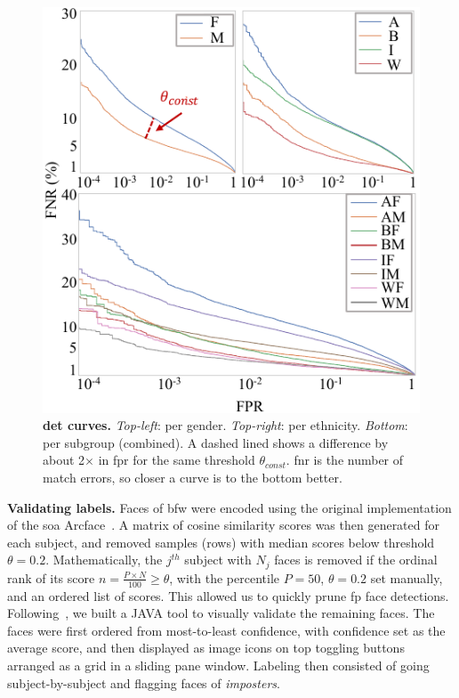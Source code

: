 \begin{figure}[!t] 
	\centering    
	\includegraphics[width=\linewidth]{figures/detcurve-improved.pdf}
		\caption{\textbf{\gls{det} curves.} \emph{Top-left}: per gender. \emph{Top-right}: per ethnicity. \emph{Bottom}: per subgroup (\ie combined). A dashed lined shows a difference by about 2$\times$ in \gls{fpr} for the same threshold $\theta_{const}$. \gls{fnr} is the number of match errors, so closer a curve is to the bottom better.}
\label{fig:detcurves} 
\end{figure} 

\vspace{1mm}
\noindent\textbf{Validating labels.} 
Faces of \gls{bfw} were encoded using the original implementation of the \gls{soa} Arcface~\cite{deng2019arcface}. A matrix of cosine similarity scores was then generated for each subject, and removed samples (\ie rows) with median scores below threshold $\theta=0.2$. Mathematically, the $j^{th}$ subject with $N_j$ faces is removed if the ordinal rank of its score $n = \frac{P\times N}{100}\geq\theta$, with the percentile $P=50$, $\theta=0.2$ set manually, and an ordered list of scores. This allowed us to quickly prune \gls{fp} face detections. Following~\cite{robinson2016families, robinson2018visual}, we built a JAVA tool to visually validate the remaining faces. The faces were first ordered from most-to-least confidence, with confidence set as the average score, and then displayed as image icons on top toggling buttons arranged as a grid in a sliding pane window. Labeling then consisted of going subject-by-subject and flagging faces of \emph{imposters}. 


